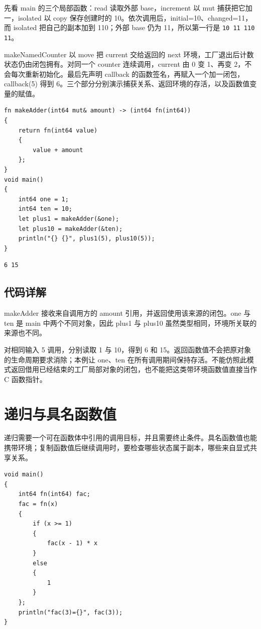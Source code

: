 先看 main 的三个局部函数：read 读取外部 base，increment 以 mut 捕获把它加一，isolated 以 copy 保存创建时的 10。依次调用后，initial=10、changed=11，而 isolated 把自己的副本加到 110；外部 base 仍为 11，所以第一行是 \texttt{10 11 110 11}。

makeNamedCounter 以 move 把 current 交给返回的 next 环境，工厂退出后计数状态仍由闭包拥有。对同一个 counter 连续调用，current 由 0 变 1、再变 2，不会每次重新初始化。最后先声明 callback 的函数签名，再赋入一个加一闭包，callback(5) 得到 6。三个部分分别演示捕获关系、返回环境的存活，以及函数值变量的赋值。

\par
\medskip
\begin{lstlisting}[style=chali]
fn makeAdder(int64 mut& amount) -> (int64 fn(int64))
{
    return fn(int64 value)
    {
        value + amount
    };
}
void main()
{
    int64 one = 1;
    int64 ten = 10;
    let plus1 = makeAdder(&one);
    let plus10 = makeAdder(&ten);
    println("{} {}", plus1(5), plus10(5));
}
\end{lstlisting}
\par
\medskip

\par
\medskip
\begin{lstlisting}[style=out]
6 15
\end{lstlisting}
\par
\medskip

\subsection*{代码详解}

makeAdder 接收来自调用方的 amount 引用，并返回使用该来源的闭包。one 与 ten 是 main 中两个不同对象，因此 plus1 与 plus10 虽然类型相同，环境所关联的来源也不同。

对相同输入 5 调用，分别读取 1 与 10，得到 6 和 15。返回函数值不会把原对象的生命周期要求消除；本例让 one、ten 在所有调用期间保持存活。不能仿照此模式返回借用已经结束的工厂局部对象的闭包，也不能把这类带环境函数值直接当作 C 函数指针。

\section{递归与具名函数值}

递归需要一个可在函数体中引用的调用目标，并且需要终止条件。具名函数值也能携带环境；复制函数值后继续调用时，要检查哪些状态属于副本，哪些来自显式共享关系。

\par
\medskip
\begin{lstlisting}[style=chali]
void main()
{
    int64 fn(int64) fac;
    fac = fn(x)
    {
        if (x >= 1)
        {
            fac(x - 1) * x
        }
        else
        {
            1
        }
    };
    println("fac(3)={}", fac(3));
}
\end{lstlisting}
\par
\medskip

